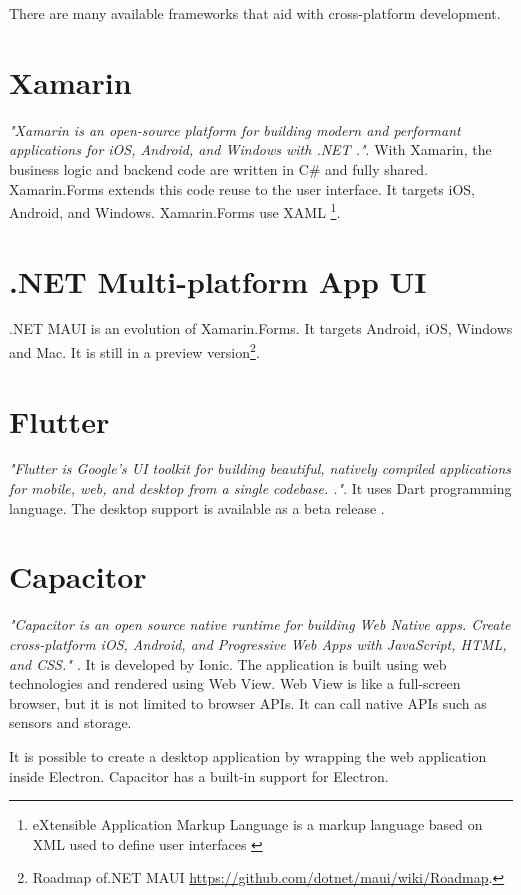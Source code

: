 \documentclass[
  digital, %
  table,   %
  oneside, %
  lof,     %
  lot,     %
]{fithesis3}
\begin{document}
There are many available frameworks that aid with cross-platform development.

\section{Xamarin}
\textit{"Xamarin is an open-source platform for building modern and performant applications for iOS, Android, and Windows with .NET \cite{WhatIsXamarin}."}. With Xamarin, the business logic and backend code are written in C\# and fully shared.
Xamarin.Forms extends this code reuse to the user interface. It targets iOS, Android, and Windows. Xamarin.Forms use XAML \footnote{eXtensible Application Markup Language is a markup language based on XML used to define user interfaces \cite{hermes2019building}}.

\section{.NET Multi-platform App UI}
.NET MAUI is an evolution of Xamarin.Forms. It targets Android, iOS, Windows and Mac. It is still in a preview version\footnote{Roadmap of.NET MAUI \url{https://github.com/dotnet/maui/wiki/Roadmap}.}.

\section{Flutter}
\textit{"Flutter is Google’s UI toolkit for building beautiful, natively compiled applications for mobile, web, and desktop from a single codebase. \cite{FlutterHomepage}."}. It uses Dart programming language. The desktop support is available as a beta release \cite{FlutterDesktopSupport}.

\section{Capacitor}
\textit{"Capacitor is an open source native runtime for building Web Native apps. Create cross-platform iOS, Android, and Progressive Web Apps with JavaScript, HTML, and CSS." \cite{CapacitorHomepage}}. It is developed by Ionic. The application is built using web technologies and rendered using Web View. Web View is like a full-screen browser, but it is not limited to browser APIs. It can call native APIs such as sensors and storage. 

It is possible to create a desktop application by wrapping the web application inside Electron. Capacitor has a built-in support for Electron.
\end{document}
